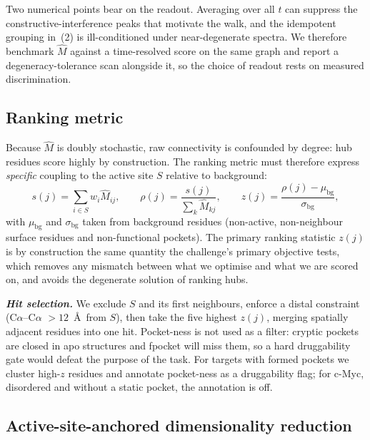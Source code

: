\documentclass[10pt,a4paper]{article}
\newcommand{\Mhat}{\hat{M}}
\newcommand{\lead}[1]{\textbf{\textit{#1}}}
\begin{document}
Two numerical points bear on the readout. Averaging over all $t$ can suppress the
constructive-interference peaks that motivate the walk, and the idempotent grouping in~(2) is
ill-conditioned under near-degenerate spectra. We therefore benchmark $\Mhat$ against a time-resolved
score on the same graph and report a degeneracy-tolerance scan alongside it, so the choice of readout
rests on measured discrimination.

\subsection{Ranking metric}

Because $\Mhat$ is doubly stochastic, raw connectivity is confounded by degree: hub residues score
highly by construction. The ranking metric must therefore express \emph{specific} coupling to the
active site $S$ relative to background:
\begin{equation}
s(j) = \sum_{i \in S} w_i \Mhat_{ij}, \qquad
\rho(j) = \frac{s(j)}{\sum_{k} \Mhat_{kj}}, \qquad
z(j) = \frac{\rho(j) - \mu_{\mathrm{bg}}}{\sigma_{\mathrm{bg}}},
\end{equation}
with $\mu_{\mathrm{bg}}$ and $\sigma_{\mathrm{bg}}$ taken from background residues (non-active,
non-neighbour surface residues and non-functional pockets). The primary ranking statistic $z(j)$ is
by construction the same quantity the challenge's primary objective tests, which removes any
mismatch between what we optimise and what we are scored on, and avoids the degenerate solution of
ranking hubs.

\lead{Hit selection.} We exclude $S$ and its first neighbours, enforce a distal constraint
(C$\alpha$--C$\alpha$ $> 12$~\AA\ from $S$), then take the five highest $z(j)$, merging spatially
adjacent residues into one hit. Pocket-ness is not used as a filter: cryptic pockets are closed in apo structures and fpocket will
miss them, so a hard druggability gate would defeat the purpose of the task. For targets with formed pockets we cluster high-$z$ residues and annotate pocket-ness as
a druggability flag; for c-Myc, disordered and without a static pocket, the annotation is off.

\subsection{Active-site-anchored dimensionality reduction}
\end{document}
